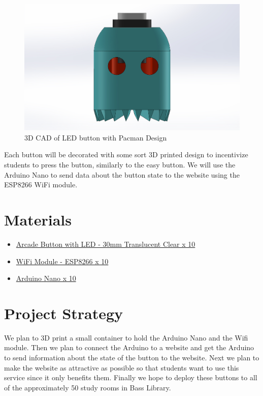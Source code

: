 \documentclass[12pt]{article}
\begin{document}
    \begin{figure}[h!]
        \centering
        \includegraphics[scale=0.25]{pacman.jpg}
        \caption{3D CAD of LED button with Pacman Design}\label{button}
    \end{figure}

    Each button will be decorated with some sort 3D printed design to incentivize students
    to press the button, similarly to the easy button. We will use the Arduino Nano to send data
    about the button state to the website using the ESP8266 WiFi module. 
\section{Materials}
\begin{itemize}
    \item \href{https://www.adafruit.com/product/3491}{Arcade Button with LED - 30mm Translucent Clear x 10} 
    \item \href{https://www.sparkfun.com/products/13678}{WiFi Module - ESP8266 x 10}
    \item \href{https://www.amazon.com/Arduino-Elegoo-ATmega328P-without-compatible/dp/B0713XK923}{Arduino Nano x 10}
\end{itemize}
\section{Project Strategy}
    We plan to 3D print a small container to hold the Arduino Nano and the Wifi module.
    Then we plan to connect the Arduino to a website and get the Arduino 
    to send information about the state of the button to the website. Next we plan
    to make the website as attractive as possible so that students want to use 
    this service since it only benefits them. Finally we hope to deploy these 
    buttons to all of the approximately 50 study rooms in Bass Library.
\end{document}
